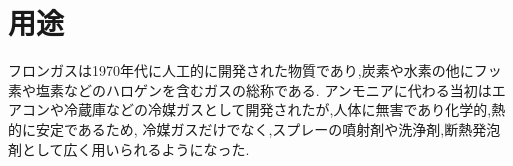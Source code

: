 \section{用途}
フロンガスは1970年代に人工的に開発された物質であり,炭素や水素の他にフッ素や塩素などのハロゲンを含むガスの総称である.
アンモニアに代わる当初はエアコンや冷蔵庫などの冷媒ガスとして開発されたが,人体に無害であり化学的,熱的に安定であるため,
冷媒ガスだけでなく,スプレーの噴射剤や洗浄剤,断熱発泡剤として広く用いられるようになった\cite{ozonpump45:online}.